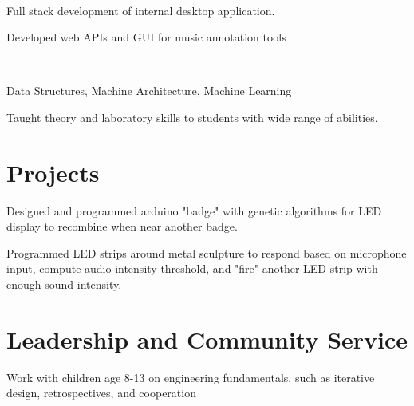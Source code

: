 \documentclass[]{csaund_resume-openfont}
\begin{document}
\begin{minipage}[t]{0.66\textwidth}
 \\
\begin{tightemize}
\item Full stack development of internal desktop application.
\item Developed web APIs and GUI for music annotation tools
\end{tightemize}
\sectionsep

\\
\begin{tightemize}
\item Data Structures, Machine Architecture, Machine Learning
\item Taught theory and laboratory skills to students with wide range of abilities.
\end{tightemize}
\sectionsep



\section{Projects}
\begin{tightemize}
\item Designed and programmed arduino "badge" with  genetic algorithms for LED display to recombine when near another badge.
\end{tightemize}
\sectionsep
{}
\begin{tightemize}
\item Programmed LED strips around metal sculpture to respond based on microphone input, compute audio intensity threshold, and "fire" another LED strip with enough sound intensity.
\end{tightemize}
\sectionsep

\end{minipage}

\pagebreak


\section{Leadership and Community Service}
Work with children age 8-13 on engineering fundamentals, such as iterative design, retrospectives, and cooperation
\sectionsep
\end{document}

